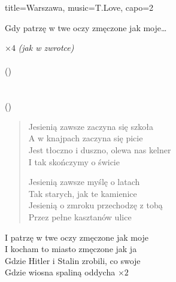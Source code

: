 \begin{song}{title={Warszawa}, music={T.Love}, capo=2}
\begin{multicols}{2}
\begin{chorus}
          \smallskip

        Gdy patrzę w twe oczy zmęczone jak moje\ldots
    \end{chorus}
    \begin{interlude}
            $\times 4$ \textit{(jak w zwrotce)} \medskip \\
           \\
        ()   \\
           \medskip \\
           \\
        ()   \\
    \end{interlude}
    \begin{verse}
        Jesienią zawsze zaczyna się szkoła \\
        A w knajpach zaczyna się picie \\
        Jest tłoczno i duszno, olewa nas kelner \\
        I tak skończymy o świcie \medskip

        Jesienią zawsze myślę o latach \\
        Tak starych, jak te kamienice \\
        Jesienią o zmroku przechodzę z tobą \\
        Przez pełne kasztanów ulice
    \end{verse}
    \begin{chorus}
        I patrzę w twe oczy zmęczone jak moje \\
        I kocham to miasto zmęczone jak ja \\
        Gdzie Hitler i Stalin zrobili, co swoje \\
        Gdzie wiosna spaliną oddycha $\times 2$
    \end{chorus}
    \begin{outro}
         
    \end{outro}
    \end{multicols}
\end{song}

